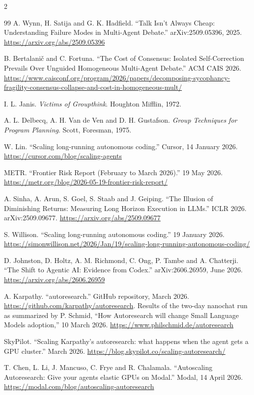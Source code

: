 \documentclass[11pt,letterpaper]{article}
\begin{document}
\begin{multicols}{2}
{\begin{thebibliography}{99}
 A. Wynn, H. Satija and G. K. Hadfield. ``Talk Isn't Always Cheap:
Understanding Failure Modes in Multi-Agent Debate.'' arXiv:2509.05396, 2025.
\url{https://arxiv.org/abs/2509.05396}

 B. Bertalanič and C. Fortuna. ``The Cost of Consensus: Isolated
Self-Correction Prevails Over Unguided Homogeneous Multi-Agent Debate.'' ACM CAIS 2026.
\url{https://www.caisconf.org/program/2026/papers/decomposing-sycophancy-fragility-consensus-collapse-and-cost-in-homogeneous-mult/}

 I. L. Janis. \emph{Victims of Groupthink}. Houghton Mifflin, 1972.

 A. L. Delbecq, A. H. Van de Ven and D. H. Gustafson. \emph{Group
Techniques for Program Planning}. Scott, Foresman, 1975.

 W. Lin. ``Scaling long-running autonomous coding.'' Cursor,
14 January 2026.
\url{https://cursor.com/blog/scaling-agents}

 METR. ``Frontier Risk Report (February to March 2026).'' 19 May 2026.
\url{https://metr.org/blog/2026-05-19-frontier-risk-report/}

 A. Sinha, A. Arun, S. Goel, S. Staab and J. Geiping. ``The Illusion of
Diminishing Returns: Measuring Long Horizon Execution in LLMs.'' ICLR 2026.
arXiv:2509.09677.
\url{https://arxiv.org/abs/2509.09677}

 S. Willison. ``Scaling long-running autonomous coding.''
19 January 2026.
\url{https://simonwillison.net/2026/Jan/19/scaling-long-running-autonomous-coding/}

 D. Johnston, D. Holtz, A. M. Richmond, C. Ong, P. Tambe and A. Chatterji.
``The Shift to Agentic AI: Evidence from Codex.'' arXiv:2606.26959, June 2026.
\url{https://arxiv.org/abs/2606.26959}

 A. Karpathy. ``autoresearch.'' GitHub repository, March 2026.
\url{https://github.com/karpathy/autoresearch}. Results of the two-day nanochat run as
summarized by P. Schmid, ``How Autoresearch will change Small Language Models adoption,''
10 March 2026. \url{https://www.philschmid.de/autoresearch}

 SkyPilot. ``Scaling Karpathy's autoresearch: what happens when the agent
gets a GPU cluster.'' March 2026. \url{https://blog.skypilot.co/scaling-autoresearch/}

 T. Chen, L. Li, J. Mancuso, C. Frye and R. Chalamala. ``Autoscaling
Autoresearch: Give your agents elastic GPUs on Modal.'' Modal, 14 April 2026.
\url{https://modal.com/blog/autoscaling-autoresearch}


\end{thebibliography}}
\end{multicols}
\end{document}
